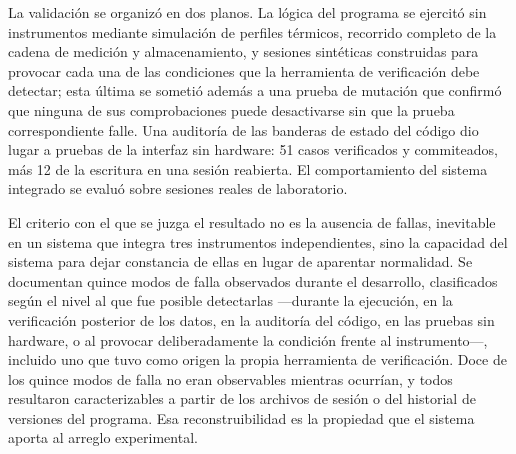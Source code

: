 La validación se organizó en dos planos. La lógica del programa se
ejercitó sin instrumentos mediante simulación de perfiles térmicos,
recorrido completo de la cadena de medición y almacenamiento, y
sesiones sintéticas construidas para provocar cada una de las
condiciones que la herramienta de verificación debe detectar; esta
última se sometió además a una prueba de mutación que confirmó que
ninguna de sus comprobaciones puede desactivarse sin que la prueba
correspondiente falle. Una auditoría de las banderas de estado del
código dio lugar a pruebas de la interfaz sin hardware: 51 casos
verificados y commiteados, más 12 de la escritura en una sesión
reabierta. El comportamiento del sistema integrado se evaluó sobre
sesiones reales de laboratorio.

El criterio con el que se juzga el resultado no es la ausencia de
fallas, inevitable en un sistema que integra tres instrumentos
independientes, sino la capacidad del sistema para dejar constancia de
ellas en lugar de aparentar normalidad. Se documentan quince modos de falla
observados durante el desarrollo, clasificados según el nivel al que
fue posible detectarlas —durante la ejecución, en la verificación
posterior de los datos, en la auditoría del código, en las pruebas sin
hardware, o al provocar deliberadamente la condición frente al
instrumento—, incluido uno que tuvo como origen la propia herramienta
de verificación. Doce de los quince modos de falla no eran observables
mientras ocurrían, y todos resultaron caracterizables a partir de los
archivos de sesión o del historial de versiones del programa.
Esa reconstruibilidad es la propiedad que el sistema aporta al
arreglo experimental.
